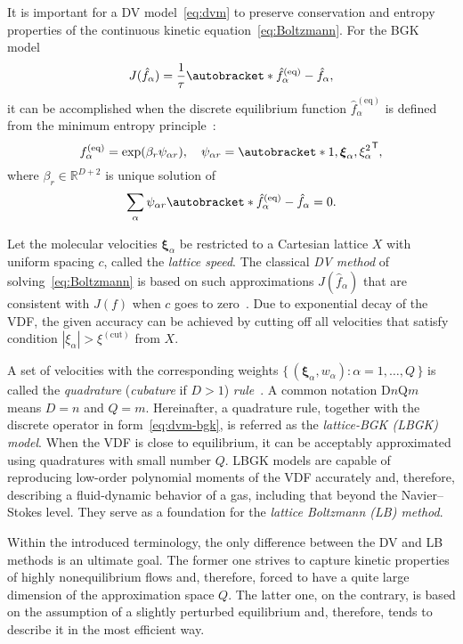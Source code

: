 \documentclass[]{elsarticle} %
\newcommand{\Set}[2]{\{\,{#1}:{#2}\,\}}
\newcommand{\transpose}[1]{#1^\mathsf{T}}
\DeclarePairedDelimiter\autobracket()       %
\newcommand{\br}[1]{\autobracket*{#1}}
\newcommand{\bxi}{{\boldsymbol{\xi}}}
\newcommand{\bxia}{\bxi_\alpha}
\newcommand{\equil}[1]{#1^\mathrm{(eq)}}
\begin{document}
{%
It is important for a DV model~\eqref{eq:dvm} to preserve conservation and entropy properties
of the continuous kinetic equation~\eqref{eq:Boltzmann}.
For the BGK model
\begin{equation}\label{eq:dvm-bgk}
    J(\hat{f}_\alpha) = \frac1\tau\br{\equil{\hat{f}}_\alpha-\hat{f}_\alpha},
\end{equation}
it can be accomplished when the discrete equilibrium function \(\equil{\hat{f}}_\alpha\)
is defined from the minimum entropy principle~\cite{Mieussens2000}:
\begin{equation}\label{eq:equilibrium-bgk}
    \equil{f}_\alpha = \exp(\beta_r\psi_{\alpha r}), \quad
    \psi_{\alpha r} = \transpose{\br{1,\bxia, \xi_\alpha^2}},
\end{equation}
where \(\beta_r\in\mathbb{R}^{D+2}\) is unique solution of
\begin{equation}\label{eq:beta}
    \sum_\alpha\psi_{\alpha r}\br{\equil{\hat{f}}_\alpha - \hat{f}_\alpha} = 0.
\end{equation}

Let the molecular velocities \(\bxia\) be restricted to a Cartesian lattice \(X\)
with uniform spacing \(c\), called the \emph{lattice speed}.
The classical \emph{DV method} of solving~\eqref{eq:Boltzmann} is based on such approximations \(J(\hat{f}_\alpha)\)
that are consistent with \(J(f)\) when \(c\) goes to zero~\cite{Aristov2001}.
Due to exponential decay of the VDF, the given accuracy can be achieved
by cutting off all velocities that satisfy condition \(|\xi_\alpha| > \xi^{(\mathrm{cut})}\) from \(X\).

A set of velocities with the corresponding weights \(\Set{(\bxia,w_\alpha)}{\alpha=1,\dots,Q}\)
is called the \emph{quadrature} (\emph{cubature} if \(D>1\)) \emph{rule}~\cite{Stroud1971}.
A common notation D\(n\)Q\(m\) means \(D=n\) and \(Q=m\).
Hereinafter, a quadrature rule, together with the discrete operator in form~\eqref{eq:dvm-bgk},
is referred as the \emph{lattice-BGK (LBGK) model}.
When the VDF is close to equilibrium, it can be acceptably approximated using quadratures with small number \(Q\).
LBGK models are capable of reproducing low-order polynomial moments of the VDF accurately and,
therefore, describing a fluid-dynamic behavior of a gas, including that beyond the Navier--Stokes level.
They serve as a foundation for the \emph{lattice Boltzmann (LB) method}.

Within the introduced terminology, the only difference between the DV and LB methods is an ultimate goal.
The former one strives to capture kinetic properties of highly nonequilibrium flows and, therefore,
forced to have a quite large dimension of the approximation space \(Q\).
The latter one, on the contrary, is based on the assumption of a slightly perturbed equilibrium and, therefore,
tends to describe it in the most efficient way.

}
\end{document}
